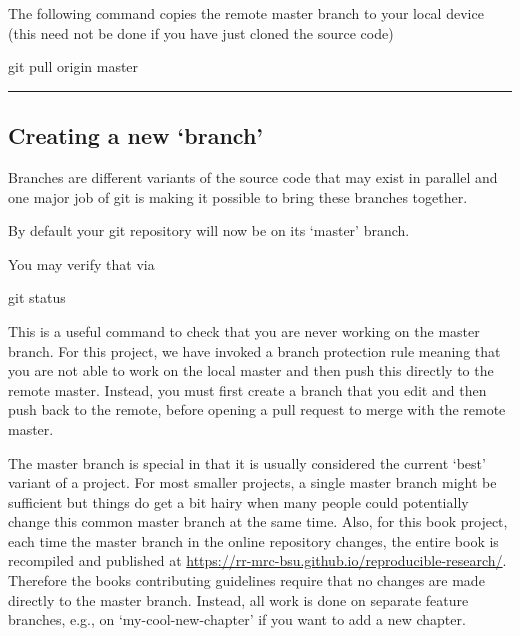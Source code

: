 \documentclass[]{book}
\newenvironment{Shaded}{\begin{snugshade}}{\end{snugshade}}
\newcommand{\FunctionTok}[1]{\textcolor[rgb]{0.00,0.00,0.00}{#1}}
\newcommand{\NormalTok}[1]{#1}
\begin{document}
The following command copies the remote master branch to your local
device (this need not be done if you have just cloned the source code)

\begin{Shaded}
\begin{Highlighting}[]
\FunctionTok{git}\NormalTok{ pull origin master}
\end{Highlighting}
\end{Shaded}

\begin{center}\rule{0.5\linewidth}{\linethickness}\end{center}

\subsection{\texorpdfstring{Creating a new
`branch'}{Creating a new branch}}\label{creating-a-new-branch}

Branches are different variants of the source code that may exist in
parallel and one major job of git is making it possible to bring these
branches together.

By default your git repository will now be on its `master' branch.

You may verify that via

\begin{Shaded}
\begin{Highlighting}[]
\FunctionTok{git}\NormalTok{ status}
\end{Highlighting}
\end{Shaded}

This is a useful command to check that you are never working on the
master branch. For this project, we have invoked a branch protection
rule meaning that you are not able to work on the local master and then
push this directly to the remote master. Instead, you must first create
a branch that you edit and then push back to the remote, before opening
a pull request to merge with the remote master.

The master branch is special in that it is usually considered the
current `best' variant of a project. For most smaller projects, a single
master branch might be sufficient but things do get a bit hairy when
many people could potentially change this common master branch at the
same time. Also, for this book project, each time the master branch in
the online repository changes, the entire book is recompiled and
published at \url{https://rr-mrc-bsu.github.io/reproducible-research/}.
Therefore the books contributing guidelines require that no changes are
made directly to the master branch. Instead, all work is done on
separate feature branches, e.g., on `my-cool-new-chapter' if you want to
add a new chapter.
\end{document}
